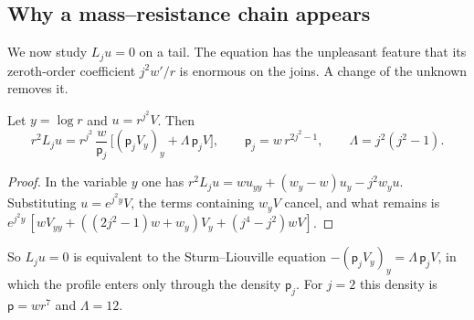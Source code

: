 \subsection{Why a mass--resistance chain appears}
\label{subsec:mass-resistance}

We now study $L_ju=0$ on a tail. The equation has the unpleasant
feature that its zeroth-order coefficient $j^2w'/r$ is enormous on the
joins. A change of the unknown removes it.

\begin{lemma}[Gauge]\label{lem:gauge}
Let $y=\log r$ and $u=r^{j^2}V$. Then
\begin{equation}\label{eq:rad-eq-rm13}
 r^2L_ju=r^{j^2}\,\frac{w}{\mathsf p_j}\,
 \bigl[(\mathsf p_jV_y)_y+\Lambda\,\mathsf p_jV\bigr],
 \qquad \mathsf p_j=w\,r^{2j^2-1},\qquad \Lambda=j^2(j^2-1).
\end{equation}
\end{lemma}

\begin{proof}
In the variable $y$ one has
$r^2L_ju=wu_{yy}+(w_y-w)u_y-j^2w_yu$. Substituting
$u=e^{j^2y}V$, the terms containing $w_yV$ cancel, and what remains is
$e^{j^2y}\,[wV_{yy}+((2j^2-1)w+w_y)V_y+(j^4-j^2)wV]$.
\end{proof}

So $L_ju=0$ is equivalent to the Sturm--Liouville equation
$-(\mathsf p_jV_y)_y=\Lambda\,\mathsf p_jV$, in which the profile
enters only through the density $\mathsf p_j$. For $j=2$ this density
is $\mathsf p=wr^7$ and $\Lambda=12$.

